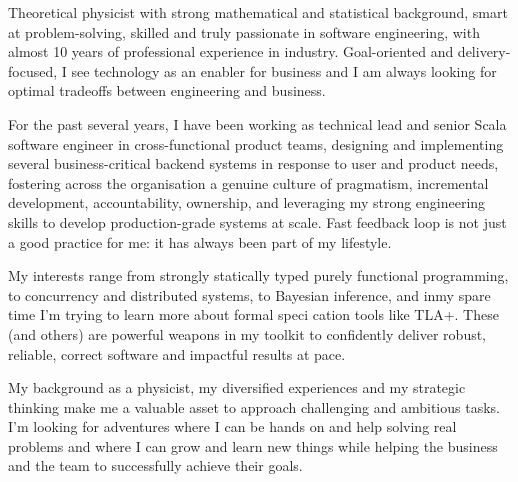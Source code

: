 
\begin{cvparagraph}
Theoretical physicist with strong mathematical and statistical 
background, smart at problem-solving, skilled and truly passionate in software engineering, with almost 10 years of professional experience in industry. Goal-oriented and delivery-focused, I see technology as an enabler for business and I am always looking for optimal tradeoffs between engineering and business.

  For the past several years, I have been working as technical lead and senior Scala software engineer in cross-functional product teams, designing and implementing several business-critical backend systems in response to user and product needs, fostering  across the organisation a genuine culture of pragmatism, incremental development, accountability, ownership, and leveraging my strong engineering skills 
  to develop production-grade systems at scale. Fast feedback loop is not just a good practice for me: it has always been part of my lifestyle.

  My interests range from strongly statically typed purely functional programming, to concurrency and distributed systems, to Bayesian inference, and inmy spare time I'm trying to learn more about formal speci cation tools like TLA+. These (and others) are powerful weapons in my toolkit to confidently deliver robust, reliable, correct software and impactful results at pace. 

My background as a physicist, my diversified experiences and my strategic thinking make me a valuable asset to approach challenging and ambitious tasks. I'm looking for adventures where I can be hands on and help solving real problems and where I can grow and learn new things while helping the business and the team to successfully achieve their goals. 
\end{cvparagraph}
